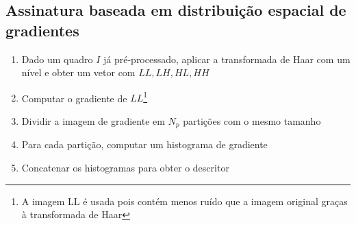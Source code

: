 \subsection{Assinatura baseada em distribuição espacial de gradientes}

\begin{enumerate}
\item Dado um quadro $I$ já pré-processado, aplicar a transformada de Haar com um nível e obter um vetor com $LL,LH,HL,HH$
\item Computar o gradiente de $LL$\footnote{A imagem LL é usada pois contém menos ruído que a imagem original graças à transformada de Haar}
\item Dividir a imagem de gradiente em $N_p$ partições com o mesmo tamanho
\item Para cada partição, computar um histograma de gradiente
\item Concatenar os histogramas  para obter o descritor
\end{enumerate}